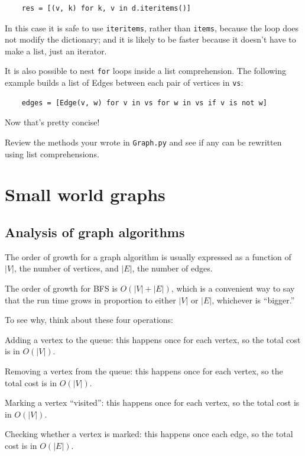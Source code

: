 \documentclass[10pt]{book}
\begin{document}
\begin{verbatim}
    res = [(v, k) for k, v in d.iteritems()]
\end{verbatim}

In this case it is safe to use
{\tt iteritems}, rather than {\tt items}, because
the loop does not modify the dictionary; and it is likely to be
faster because it doesn't have to make a list, just an iterator.

It is also possible to nest {\tt for} loops inside
a list comprehension.  The following example builds a list
of Edges between each pair of vertices in {\tt vs}:

\begin{verbatim}
    edges = [Edge(v, w) for v in vs for w in vs if v is not w]
\end{verbatim}

Now that's pretty concise!

\begin{ex}

Review the methods your wrote in {\tt Graph.py} and see if any
can be rewritten using list comprehensions.

\end{ex}


\chapter{Small world graphs}

\section{Analysis of graph algorithms}

\newcommand{\V}{|V|}
\newcommand{\E}{|E|}

The order of growth for a graph algorithm is usually expressed
as a function of $\V$, the number of vertices, and $\E$, the number
of edges.

The order of growth for BFS is $O(\V + \E)$, which is a convenient
way to say that the run time grows in proportion to either $\V$ or
$\E$, whichever is ``bigger.''

To see why, think about these four operations: 

\begin{description}

\item Adding a vertex to the queue: this happens once for each
vertex, so the total cost is in $O(\V)$.

\item Removing a vertex from the queue: this happens once for each
vertex, so the total cost is in $O(\V)$.

\item Marking a vertex ``visited'': this happens once for each
vertex, so the total cost is in $O(\V)$.

\item Checking whether a vertex is marked: this happens once each
edge, so the total cost is in $O(\E)$.

\end{description}
\end{document}
